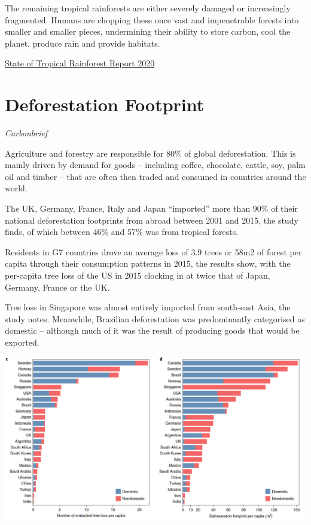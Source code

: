 \documentclass[
]{book}
\begin{document}
The remaining tropical rainforests are either severely damaged or increasingly fragmented.
Humans are chopping these once vast and impenetrable forests into smaller and smaller pieces,
undermining their ability to store carbon, cool the planet, produce rain and provide habitats.

\href{https://www.regnskog.no/en/news/only-half-of-the-worlds-rainforests-remains-intact}{State of Tropical Rainforest Report 2020}

\hypertarget{deforestation-footprint}{%
\section{Deforestation Footprint}\label{deforestation-footprint}}

\emph{Carbonbrief}

Agriculture and forestry are responsible for 80\% of global deforestation.
This is mainly driven by demand for goods --
including coffee, chocolate, cattle, soy, palm oil and timber --
that are often then traded and consumed in countries around the world.

The UK, Germany, France, Italy and Japan ``imported'' more than
90\% of their national deforestation footprints from abroad between 2001 and 2015,
the study finds, of which between 46\% and 57\% was from tropical forests.

Residents in G7 countries drove an average loss of 3.9 trees or 58m2 of forest per capita through their consumption patterns in 2015, the results show, with the per-capita tree loss of the US in 2015 clocking in at twice that of Japan, Germany, France or the UK.

Tree loss in Singapore was almost entirely imported from south-east Asia, the study notes. Meanwhile, Brazilian deforestation was predominantly categorised as domestic -- although much of it was the result of producing goods that would be exported.

\includegraphics{fig/deforestaion_footprint.jpg}
\end{document}
